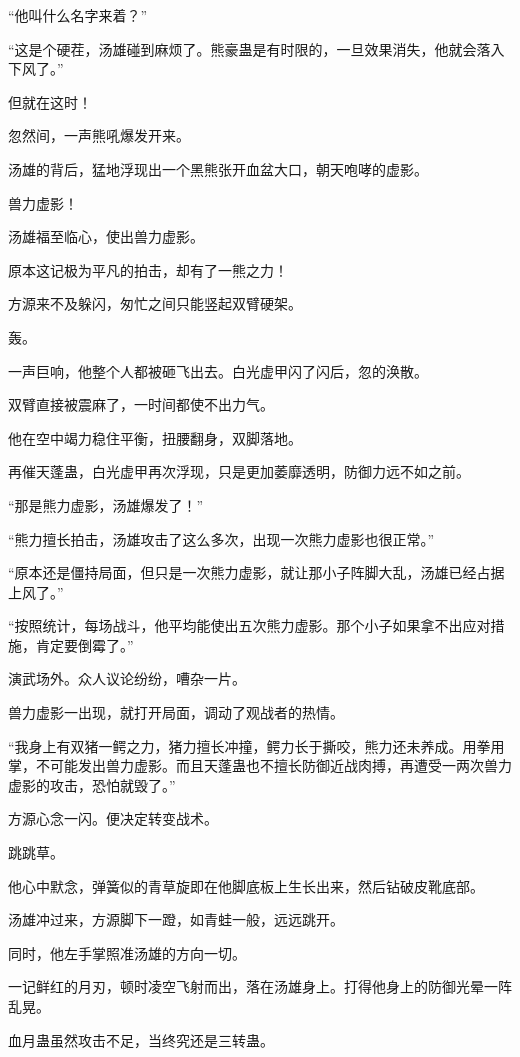 \begin{this_body}
“他叫什么名字来着？”

“这是个硬茬，汤雄碰到麻烦了。熊豪蛊是有时限的，一旦效果消失，他就会落入下风了。”

但就在这时！

忽然间，一声熊吼爆发开来。

汤雄的背后，猛地浮现出一个黑熊张开血盆大口，朝天咆哮的虚影。

兽力虚影！

汤雄福至临心，使出兽力虚影。

原本这记极为平凡的拍击，却有了一熊之力！

方源来不及躲闪，匆忙之间只能竖起双臂硬架。

轰。

一声巨响，他整个人都被砸飞出去。白光虚甲闪了闪后，忽的涣散。

双臂直接被震麻了，一时间都使不出力气。

他在空中竭力稳住平衡，扭腰翻身，双脚落地。

再催天蓬蛊，白光虚甲再次浮现，只是更加萎靡透明，防御力远不如之前。

“那是熊力虚影，汤雄爆发了！”

“熊力擅长拍击，汤雄攻击了这么多次，出现一次熊力虚影也很正常。”

“原本还是僵持局面，但只是一次熊力虚影，就让那小子阵脚大乱，汤雄已经占据上风了。”

“按照统计，每场战斗，他平均能使出五次熊力虚影。那个小子如果拿不出应对措施，肯定要倒霉了。”

演武场外。众人议论纷纷，嘈杂一片。

兽力虚影一出现，就打开局面，调动了观战者的热情。

“我身上有双猪一鳄之力，猪力擅长冲撞，鳄力长于撕咬，熊力还未养成。用拳用掌，不可能发出兽力虚影。而且天蓬蛊也不擅长防御近战肉搏，再遭受一两次兽力虚影的攻击，恐怕就毁了。”

方源心念一闪。便决定转变战术。

跳跳草。

他心中默念，弹簧似的青草旋即在他脚底板上生长出来，然后钻破皮靴底部。

汤雄冲过来，方源脚下一蹬，如青蛙一般，远远跳开。

同时，他左手掌照准汤雄的方向一切。

一记鲜红的月刃，顿时凌空飞射而出，落在汤雄身上。打得他身上的防御光晕一阵乱晃。

血月蛊虽然攻击不足，当终究还是三转蛊。


\end{this_body}

